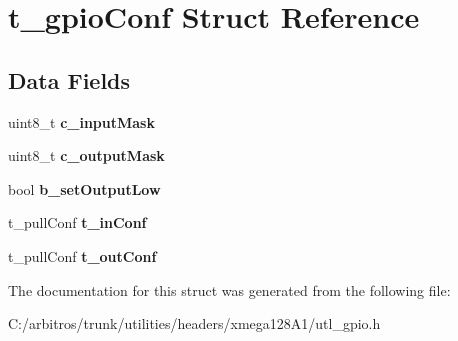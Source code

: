 \hypertarget{structt__gpio_conf}{\section{t\-\_\-gpio\-Conf Struct Reference}
\label{structt__gpio_conf}
}
\subsection*{Data Fields}
\begin{DoxyCompactItemize}
\item 
\hypertarget{structt__gpio_conf_a0ca7e3f3f53699e027a9371ac9621d81}{uint8\-\_\-t {\bfseries c\-\_\-input\-Mask}}\label{structt__gpio_conf_a0ca7e3f3f53699e027a9371ac9621d81}

\item 
\hypertarget{structt__gpio_conf_aff7e71c37e9719718b036f0bda98f6ad}{uint8\-\_\-t {\bfseries c\-\_\-output\-Mask}}\label{structt__gpio_conf_aff7e71c37e9719718b036f0bda98f6ad}

\item 
\hypertarget{structt__gpio_conf_aa3468c508c055b9f68bfd44b377bc6be}{bool {\bfseries b\-\_\-set\-Output\-Low}}\label{structt__gpio_conf_aa3468c508c055b9f68bfd44b377bc6be}

\item 
\hypertarget{structt__gpio_conf_a4d9cfb0237474680ba8b0e47905af802}{t\-\_\-pull\-Conf {\bfseries t\-\_\-in\-Conf}}\label{structt__gpio_conf_a4d9cfb0237474680ba8b0e47905af802}

\item 
\hypertarget{structt__gpio_conf_add47b2df0bddd1212989f1774e235a39}{t\-\_\-pull\-Conf {\bfseries t\-\_\-out\-Conf}}\label{structt__gpio_conf_add47b2df0bddd1212989f1774e235a39}

\end{DoxyCompactItemize}


The documentation for this struct was generated from the following file\-:\begin{DoxyCompactItemize}
\item 
C\-:/arbitros/trunk/utilities/headers/xmega128\-A1/utl\-\_\-gpio.\-h\end{DoxyCompactItemize}
